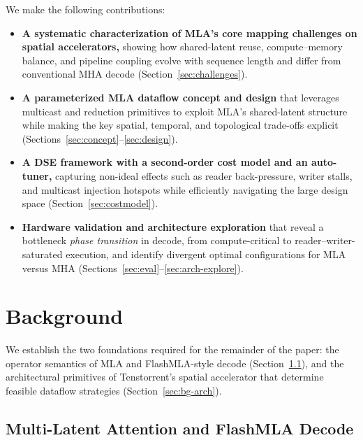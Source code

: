 \documentclass[sigconf, review, anonymous]{acmart}
\newcommand{\phaseTransition}{phase transition}
\newcommand{\autoTuner}{auto-tuner}
\begin{document}
We make the following contributions:
\begin{itemize}
  \item \textbf{A systematic characterization of MLA's core mapping
    challenges on spatial accelerators,} showing how shared-latent
    reuse, compute--memory balance, and pipeline coupling evolve with
    sequence length and differ from conventional MHA decode
    (Section~\ref{sec:challenges}).

  \item \textbf{A parameterized MLA dataflow concept and design} that
    leverages multicast and reduction primitives to exploit MLA's
    shared-latent structure while making the key spatial, temporal, and
    topological trade-offs explicit
    (Sections~\ref{sec:concept}--\ref{sec:design}).

  \item \textbf{A DSE framework with a second-order cost model and an
    \autoTuner{},} capturing non-ideal effects such as reader
    back-pressure, writer stalls, and multicast injection hotspots
    while efficiently navigating the large design space
    (Section~\ref{sec:costmodel}).

  \item \textbf{Hardware validation and architecture exploration} that
    reveal a bottleneck \emph{\phaseTransition} in decode, from
    compute-critical to reader--writer-saturated execution, and
    identify divergent optimal configurations for MLA versus MHA
    (Sections~\ref{sec:eval}--\ref{sec:arch-explore}).
\end{itemize}


\section{Background}\label{sec:background}

We establish the two foundations required for the remainder of the
paper: the operator semantics of MLA and FlashMLA-style decode
(Section~\ref{sec:bg-mla}), and the architectural primitives of
Tenstorrent's spatial accelerator that determine feasible dataflow
strategies (Section~\ref{sec:bg-arch}).



\subsection{Multi-Latent Attention and FlashMLA Decode}\label{sec:bg-mla}
\end{document}

